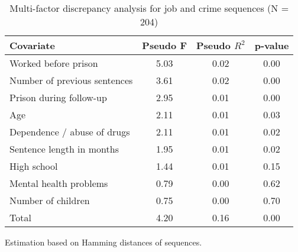 \begin{table}[htp]
\footnotesize
\setlength{\tabcolsep}{10pt}
\renewcommand{\arraystretch}{1.3}
\begin{threeparttable}
\centering
\caption{Multi-factor discrepancy analysis for job and crime sequences (N = 204)} 
\label{tab:discrepancy_crime_job}
\begin{tabular}{lccc}
  \hline
Covariate & Pseudo F & Pseudo $R^2$ & p-value \\ 
  \hline
Worked before prison & 5.03 & 0.02 & 0.00 \\ 
  Number of previous sentences & 3.61 & 0.02 & 0.00 \\ 
  Prison during follow-up & 2.95 & 0.01 & 0.00 \\ 
  Age & 2.11 & 0.01 & 0.03 \\ 
  Dependence / abuse of drugs & 2.11 & 0.01 & 0.02 \\ 
  Sentence length in months & 1.95 & 0.01 & 0.02 \\ 
  High school & 1.44 & 0.01 & 0.15 \\ 
  Mental health problems & 0.79 & 0.00 & 0.62 \\ 
  Number of children & 0.75 & 0.00 & 0.70 \\ 
  Total & 4.20 & 0.16 & 0.00 \\ 
   \hline
\end{tabular}
\begin{tablenotes}
\scriptsize
\item Estimation based on Hamming distances of sequences.
\end{tablenotes}
\end{threeparttable}
\end{table}
